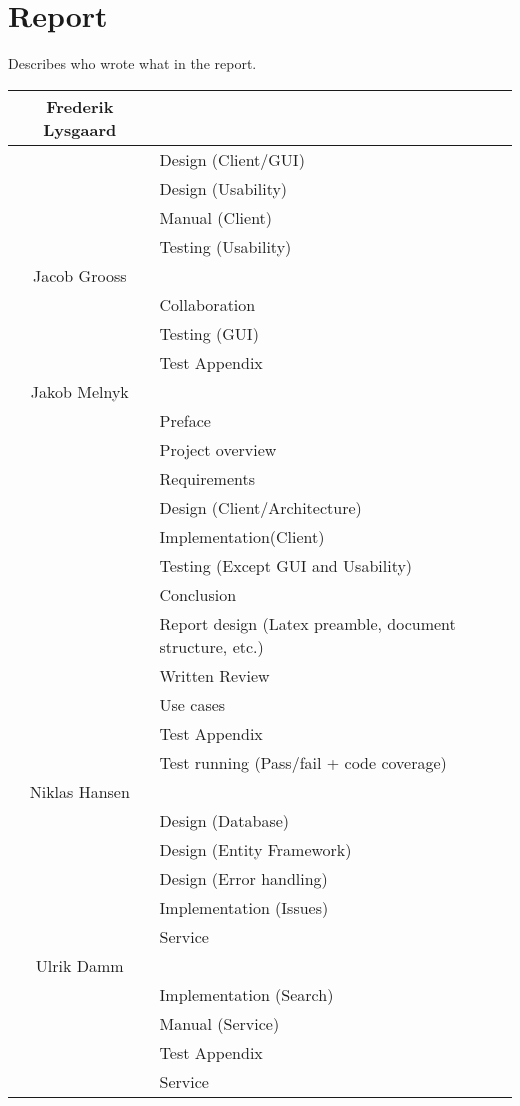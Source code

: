 \section{Report}
\label{Appendix_Who}
Describes who wrote what in the report.
\begin{centering}
\begin{longtable}{| c | p{9cm} |}
\hline
Frederik Lysgaard & \\
\hline
& Design (Client/GUI)\\
\hline
& Design (Usability)\\
\hline
& Manual (Client)\\
\hline
& Testing (Usability)\\
\hline
Jacob Grooss & \\
\hline
& Collaboration\\
\hline
& Testing (GUI)\\
\hline
& Test Appendix\\
\hline
Jakob Melnyk & \\
\hline
& Preface\\
\hline
& Project overview\\
\hline
& Requirements\\
\hline
& Design (Client/Architecture)\\
\hline
& Implementation(Client)\\
\hline
& Testing (Except GUI and Usability)\\
\hline
& Conclusion\\
\hline
& Report design (Latex preamble, document structure, etc.)\\
\hline
& Written Review\\
\hline
& Use cases\\
\hline
& Test Appendix\\
\hline
& Test running (Pass/fail + code coverage)\\
\hline
Niklas Hansen & \\
\hline
& Design (Database)\\
\hline
& Design (Entity Framework)\\
\hline
& Design (Error handling)\\
\hline
& Implementation (Issues)\\
\hline
& Service\\
\hline
Ulrik Damm & \\
\hline
& Implementation (Search)\\
\hline
& Manual (Service)\\
\hline
& Test Appendix\\
\hline
& Service\\
\hline
\end{longtable}
\end{centering}
